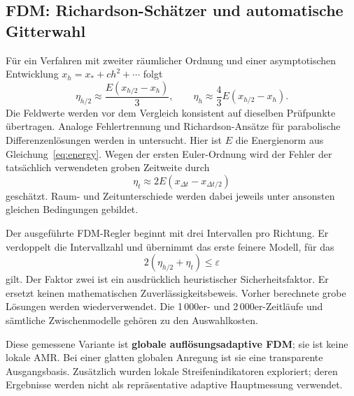 \subsection{FDM: Richardson-Schätzer und automatische Gitterwahl}
Für ein Verfahren mit zweiter räumlicher Ordnung und einer asymptotischen Entwicklung $x_h=x_*+ch^2+\cdots$ folgt
\begin{equation}
 \eta_{h/2}\approx\frac{E(x_{h/2}-x_h)}{3},\qquad
 \eta_h\approx\frac43E(x_{h/2}-x_h).
\end{equation}
Die Feldwerte werden vor dem Vergleich konsistent auf dieselben Prüfpunkte übertragen. Analoge Fehlertrennung und Richardson-Ansätze für parabolische Differenzenlösungen werden in \cite{debrabant} untersucht. Hier ist $E$ die Energienorm aus Gleichung~\eqref{eq:energy}. Wegen der ersten Euler-Ordnung wird der Fehler der tatsächlich verwendeten groben Zeitweite durch
\begin{equation}
 \eta_t\approx 2E(x_{\Delta t}-x_{\Delta t/2})
\end{equation}
geschätzt. Raum- und Zeitunterschiede werden dabei jeweils unter ansonsten gleichen Bedingungen gebildet.

Der ausgeführte FDM-Regler beginnt mit drei Intervallen pro Richtung. Er verdoppelt die Intervallzahl und übernimmt das erste feinere Modell, für das
\begin{equation}\label{eq:fdmstop}
 2(\eta_{h/2}+\eta_t)\le\varepsilon
\end{equation}
gilt. Der Faktor zwei ist ein ausdrücklich heuristischer Sicherheitsfaktor. Er ersetzt keinen mathematischen Zuverlässigkeitsbeweis. Vorher berechnete grobe Lösungen werden wiederverwendet. Die 1\,000er- und 2\,000er-Zeitläufe und sämtliche Zwischenmodelle gehören zu den Auswahlkosten.

Diese gemessene Variante ist \textbf{globale auflösungsadaptive FDM}; sie ist keine lokale AMR. Bei einer glatten globalen Anregung ist sie eine transparente Ausgangsbasis. Zusätzlich wurden lokale Streifenindikatoren exploriert; deren Ergebnisse werden nicht als repräsentative adaptive Hauptmessung verwendet.

